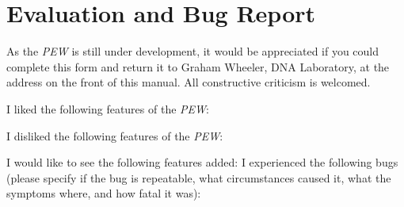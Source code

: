 

\newpage
\section[Evaluation and Bug Report]{Evaluation and Bug Report}
As the  {\em PEW} is  still under development, it would be appreciated
if you could complete this form and return it to Graham Wheeler,
DNA Laboratory, at the address on the front of this manual.
All constructive criticism is welcomed.

I liked the following features of the {\em PEW}:

\vspace{8cm}

I disliked the following features of the {\em PEW}:

\vspace{8cm}

I would like to see the following features added:
\newpage
I experienced  the following  bugs (please specify if the bug is
repeatable, what  circumstances caused  it,  what  the  symptoms
where, and how fatal it was):



